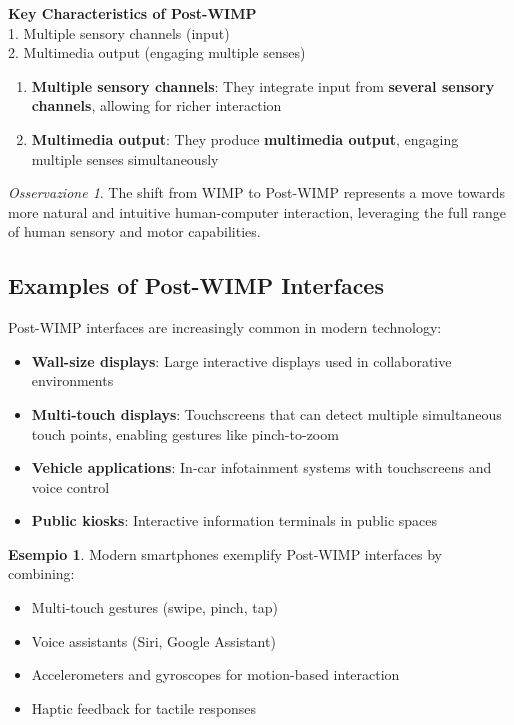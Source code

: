 \documentclass[11pt,a4paper]{article}
\theoremstyle{definition}
\newtheorem{example}{Esempio}[section]
\theoremstyle{plain}
\theoremstyle{remark}
\newtheorem*{observation}{Osservazione}
\begin{document}
\begin{center}
\colorbox{green!15}{\parbox{0.9\textwidth}{
\centering
\textbf{Key Characteristics of Post-WIMP}\\[0.2cm]
1. Multiple sensory channels (input)\\
2. Multimedia output (engaging multiple senses)
}}
\end{center}

\begin{enumerate}
    \item \textbf{Multiple sensory channels}: They integrate input from \textbf{several sensory channels}, allowing for richer interaction
    \item \textbf{Multimedia output}: They produce \textbf{multimedia output}, engaging multiple senses simultaneously
\end{enumerate}

\begin{observation}
The shift from WIMP to Post-WIMP represents a move towards more natural and intuitive human-computer interaction, leveraging the full range of human sensory and motor capabilities.
\end{observation}

\subsection{Examples of Post-WIMP Interfaces}

Post-WIMP interfaces are increasingly common in modern technology:

\begin{itemize}
    \item \textbf{Wall-size displays}: Large interactive displays used in collaborative environments
    \item \textbf{Multi-touch displays}: Touchscreens that can detect multiple simultaneous touch points, enabling gestures like pinch-to-zoom
    \item \textbf{Vehicle applications}: In-car infotainment systems with touchscreens and voice control
    \item \textbf{Public kiosks}: Interactive information terminals in public spaces
\end{itemize}

\begin{example}
Modern smartphones exemplify Post-WIMP interfaces by combining:
\begin{itemize}
    \item Multi-touch gestures (swipe, pinch, tap)
    \item Voice assistants (Siri, Google Assistant)
    \item Accelerometers and gyroscopes for motion-based interaction
    \item Haptic feedback for tactile responses
\end{itemize}
\end{example}
\end{document}
